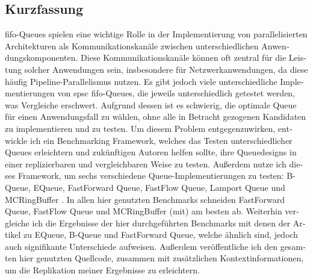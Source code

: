 \null\vfil
\begin{otherlanguage}{ngerman}

\chapter{Kurzfassung}

\noindent \acrfull{fifo}-Queues spielen eine wichtige Rolle in der Implementierung von
parallelisierten Architekturen als Kommunikationskanäle zwischen unterschiedlichen
Anwendungskomponenten\cite{WangCheng2009}.
Diese Kommunikationskanäle können oft zentral für die Leistung solcher Anwendungen sein, insbesondere für
Netzwerkanwendungen, da diese häufig Pipeline-Parallelismus nutzen\cite{Upadhyaya2007,WangCheng2009}.
Es gibt jedoch viele unterschiedliche Implementierungen von \acrfull{spsc}
\acrshort{fifo}-Queues, die jeweils unterschiedlich getestet werden, was Vergleiche erschwert.
Aufgrund dessen ist es schwierig, die optimale Queue für einen Anwendungsfall zu wählen, ohne alle in
Betracht gezogenen Kandidaten zu implementieren und zu testen.
Um diesem Problem entgegenzuwirken, entwickle ich ein Benchmarking Framework, welches das Testen
unterschiedlicher Queues erleichtern und zukünftigen Autoren helfen sollte, ihre Queuedesigns in einer
replizierbaren und vergleichbaren Weise zu testen.
Außerdem nutze ich dieses Framework, um sechs verschiedene Queue-Implementierungen zu testen: B-Queue,
EQueue, FastForward Queue, FastFlow Queue, Lamport Queue und MCRingBuffer
\cite{B-Queue,EQueue,FastForward,FastFlowGithub,Lamport,MCRingBuffer}.
In allen hier genutzten Benchmarks schneiden FastForward Queue, FastFlow Queue und MCRingBuffer (mit) am besten ab.
Weiterhin vergleiche ich die Ergebnisse der hier durchgeführten Benchmarks mit denen der Artikel zu
EQueue, B-Queue und FastForward Queue, welche ähnlich sind, jedoch auch signifikante Unterschiede aufweisen.
Außerdem veröffentliche ich den gesamten hier genutzten Quellcode, zusammen mit zusätzlichen
Kontextinformationen, um die Replikation meiner Ergebnisse zu erleichtern.

\end{otherlanguage}
\vfil\null
